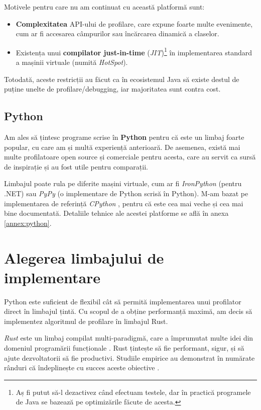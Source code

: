 Motivele pentru care nu am continuat cu această platformă sunt:
\begin{itemize}
    \item \textbf{Complexitatea} API-ului de profilare, care expune foarte multe evenimente, cum ar fi accesarea câmpurilor sau încărcarea dinamică a claselor.
    \item Existența unui \textbf{compilator just-in-time} (\textit{JIT})\footnote{Aș fi putut să-l dezactivez când efectuam testele, dar în practică programele de Java se bazează pe optimizările făcute de acesta.} în implementarea standard a mașinii virtuale (numită \textit{HotSpot}).
\end{itemize}

Totodată, aceste restricții au făcut ca în ecosistemul Java să existe destul de puține unelte de profilare/debugging, iar majoritatea sunt contra cost.

\subsection*{Python}

Am ales să țintesc programe scrise în \textbf{Python} pentru că este un limbaj foarte popular, cu care am și multă experiență anterioară. De asemenea, există mai multe profilatoare open source și comerciale pentru acesta, care au servit ca sursă de inspirație și au fost utile pentru comparații.

Limbajul poate rula pe diferite mașini virtuale, cum ar fi \emph{IronPython} \cite{ironpython} (pentru .NET) sau \emph{PyPy} \cite{pypy} (o implementare de Python scrisă în Python). M-am bazat pe implementarea de referință \emph{CPython} \cite{cpython}, pentru că este cea mai veche și cea mai bine documentată. Detaliile tehnice ale acestei platforme se află în anexa \ref{annex:python}.

\section{Alegerea limbajului de implementare}

Python este suficient de flexibil cât să permită implementarea unui profilator direct în limbajul țintă. Cu scopul de a obține performanță maximă, am decis să implementez algoritmul de profilare în limbajul Rust.

\emph{Rust} este un limbaj compilat multi-paradigmă, care a împrumutat multe idei din domeniul programării funcționale \cite{rust}. Rust țintește să fie performant, sigur, și să ajute dezvoltatorii să fie productivi. Studiile empirice au demonstrat în numărate rânduri că îndeplinește cu succes aceste obiective \cite{rust_performance}\cite{rust_memory_safety}.

